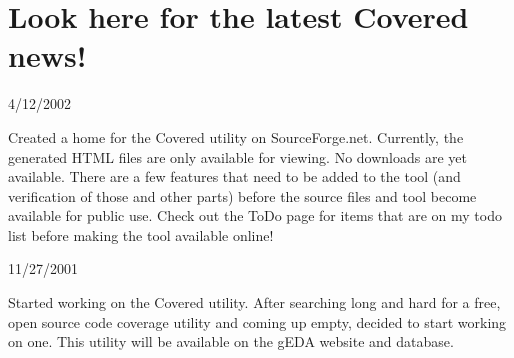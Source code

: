 \section{Look here for the latest Covered news!}\label{page_news}


\begin{CompactItemize}
\item 
4/12/2002 \end{CompactItemize}


 Created a home for the Covered utility on Source\-Forge.net. Currently, the generated HTML files are only available for viewing. No downloads are yet available. There are a few features that need to be added to the tool (and verification of those and other parts) before the source files and tool become available for public use. Check out the To\-Do page for items that are on my todo list before making the tool available online!

\begin{CompactItemize}
\item 
11/27/2001 \end{CompactItemize}


 Started working on the Covered utility. After searching long and hard for a free, open source code coverage utility and coming up empty, decided to start working on one. This utility will be available on the g\-EDA website and database.

